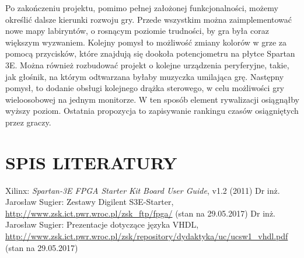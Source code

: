 \documentclass[11pt]{article}
\begin{document}
Po zakończeniu projektu, pomimo pełnej założonej funkcjonalności, możemy określić dalsze kierunki rozwoju gry.
Przede wszystkim można zaimplementować nowe mapy labiryntów, o rosnącym poziomie trudności, by gra była coraz większym wyzwaniem.
Kolejny pomysł to możliwość zmiany kolorów w grze za pomocą przycisków, które znajdują się dookoła potencjometru na płytce Spartan 3E.
Można również rozbudować projekt o kolejne urządzenia peryferyjne, takie, jak głośnik, na którym odtwarzana byłaby muzyczka umilająca grę.
Następny pomysł, to dodanie obsługi kolejnego drążka sterowego, w celu możliwości gry wieloosobowej na jednym monitorze.
W ten sposób element rywalizacji osiągnąłby wyższy poziom.
Ostatnia propozycja to zapisywanie rankingu czasów osiągniętych przez graczy.

\newpage

\section{SPIS LITERATURY}

\begin{thebibliography}{99}
 Xilinx: \textit{Spartan-3E FPGA Starter Kit Board User Guide}, v1.2 (2011)
 Dr inż. Jarosław Sugier: Zestawy Digilent S3E-Starter, \url{http://www.zsk.ict.pwr.wroc.pl/zsk_ftp/fpga/} (stan na 29.05.2017)
 Dr inż. Jarosław Sugier: Prezentacje dotyczące języka VHDL, \url{http://www.zsk.ict.pwr.wroc.pl/zsk/repository/dydaktyka/uc/ucsw1_vhdl.pdf} (stan na 29.05.2017)
\end{thebibliography}

\listoffigures

\listoftables
\end{document}
